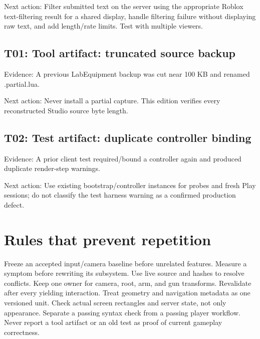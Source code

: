 Next action: Filter submitted text on the server using the appropriate Roblox text-filtering result for a shared display, handle filtering failure without displaying raw text, and add length/\allowbreak{}rate limits.\allowbreak{} Test with multiple viewers.\allowbreak{}

\subsection{T01: Tool artifact: truncated source backup}
Evidence: A previous LabEquipment backup was cut near 100 KB and renamed .\allowbreak{}partial.\allowbreak{}lua.\allowbreak{}

Next action: Never install a partial capture.\allowbreak{} This edition verifies every reconstructed Studio source byte length.\allowbreak{}

\subsection{T02: Test artifact: duplicate controller binding}
Evidence: A prior client test required/\allowbreak{}bound a controller again and produced duplicate render-step warnings.\allowbreak{}

Next action: Use existing bootstrap/\allowbreak{}controller instances for probes and fresh Play sessions; do not classify the test harness warning as a confirmed production defect.\allowbreak{}

\section{Rules that prevent repetition}
Freeze an accepted input/\allowbreak{}camera baseline before unrelated features.\allowbreak{} Measure a symptom before rewriting its subsystem.\allowbreak{} Use live source and hashes to resolve conflicts.\allowbreak{} Keep one owner for camera, root, arm, and gun transforms.\allowbreak{} Revalidate after every yielding interaction.\allowbreak{} Treat geometry and navigation metadata as one versioned unit.\allowbreak{} Check actual screen rectangles and server state, not only appearance.\allowbreak{} Separate a passing syntax check from a passing player workflow.\allowbreak{} Never report a tool artifact or an old test as proof of current gameplay correctness.\allowbreak{}

